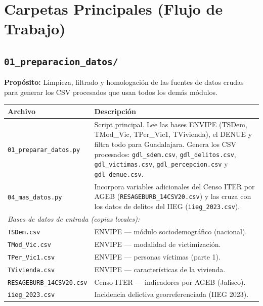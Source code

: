 \documentclass[12pt, a4paper]{article}
\begin{document}
\section{Carpetas Principales (Flujo de Trabajo)}

\subsection{\texttt{01\_preparacion\_datos/}}

\textbf{Propósito:} Limpieza, filtrado y homologación de las fuentes de datos crudas para generar los CSV procesados que usan todos los demás módulos.

\begin{table}[h!]
\centering
\small
\begin{tabular}{p{5cm} p{9cm}}
\toprule
\textbf{Archivo} & \textbf{Descripción} \\
\midrule
\texttt{01\_preparar\_datos.py} & Script principal. Lee las bases ENVIPE (TSDem, TMod\_Vic, TPer\_Vic1, TVivienda), el DENUE y filtra todo para Guadalajara. Genera los CSV procesados: \texttt{gdl\_sdem.csv}, \texttt{gdl\_delitos.csv}, \texttt{gdl\_victimas.csv}, \texttt{gdl\_percepcion.csv} y \texttt{gdl\_denue.csv}. \\
\addlinespace
\texttt{04\_mas\_datos.py} & Incorpora variables adicionales del Censo ITER por AGEB (\texttt{RESAGEBURB\_14CSV20.csv}) y las cruza con los datos de delitos del IIEG (\texttt{iieg\_2023.csv}). \\
\midrule
\multicolumn{2}{l}{\textit{Bases de datos de entrada (copias locales):}} \\
\addlinespace
\texttt{TSDem.csv} & ENVIPE --- módulo sociodemográfico (nacional). \\
\texttt{TMod\_Vic.csv} & ENVIPE --- modalidad de victimización. \\
\texttt{TPer\_Vic1.csv} & ENVIPE --- personas víctimas (parte 1). \\
\texttt{TVivienda.csv} & ENVIPE --- características de la vivienda. \\
\texttt{RESAGEBURB\_14CSV20.csv} & Censo ITER --- indicadores por AGEB (Jalisco). \\
\texttt{iieg\_2023.csv} & Incidencia delictiva georreferenciada (IIEG 2023). \\
\bottomrule
\end{tabular}
\end{table}
\end{document}
